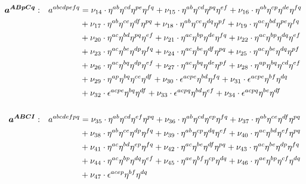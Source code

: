\documentclass[a4paper,12pt, DIV=14, BCOR=5mm, twoside, headsepline]{scrbook}
\begin{document}
\begin{align}
\begin{alignedat}{2}
\boldsymbol{a^{ABpCq}}&: \ \ \ & a^{abcdpefq}  &= \nu_{14}\cdot\eta^{ab}\eta^{cd}\eta^{pe}\eta^{fq}+\nu_{15}\cdot\eta^{ab}\eta^{cd}\eta^{pq}\eta^{ef}
+\nu_{16}\cdot\eta^{ab}\eta^{cp}\eta^{de}\eta^{fq}\\ &  &\hphantom{=} &
+\nu_{17}\cdot\eta^{ab}\eta^{ce}\eta^{df}\eta^{pq}+ 
\nu_{18}\cdot\eta^{ab}\eta^{ce}\eta^{dq}\eta^{pf}+\nu_{19}\cdot\eta^{ac}\eta^{bd}\eta^{pe}\eta^{fq} \\ &  &\hphantom{=} &
+\nu_{20}\cdot\eta^{ac}\eta^{bd}\eta^{pq}\eta^{ef}+\nu_{21}\cdot\eta^{ac}\eta^{bp}\eta^{de}\eta^{fq}+ 
\nu_{22}\cdot\eta^{ac}\eta^{bp}\eta^{dq}\eta^{ef} \\ &  &\hphantom{=} &
+\nu_{23}\cdot\eta^{ac}\eta^{be}\eta^{dp}\eta^{fq}+
\nu_{24}\cdot\eta^{ac}\eta^{be}\eta^{df}\eta^{pq}+\nu_{25}\cdot\eta^{ac}\eta^{be}\eta^{dq}\eta^{pf} \\ &  &\hphantom{=} &
+\nu_{26}\cdot\eta^{ac}\eta^{bq}\eta^{dp}\eta^{ef}+\nu_{27}\cdot\eta^{ac}\eta^{bq}\eta^{de}\eta^{pf}+ 
\nu_{28}\cdot\eta^{ap}\eta^{bq}\eta^{cd}\eta^{ef} \\ &  &\hphantom{=} &
+\nu_{29}\cdot\eta^{ap}\eta^{bq}\eta^{ce}\eta^{df} + \nu_{30}\cdot\epsilon^{acpe}\eta^{bd}\eta^{fq}+\nu_{31}\cdot\epsilon^{acpe}\eta^{bf}\eta^{dq} \\ &  &\hphantom{=} &
+\nu_{32}\cdot\epsilon^{acpe}\eta^{bq}\eta^{df}+\nu_{33}\cdot\epsilon^{acpq}\eta^{bd}\eta^{ef} 
+\nu_{34}\cdot\epsilon^{acpq}\eta^{be}\eta^{df} \\
\\
\boldsymbol{a^{ABCI}}&: \ \ \ & a^{abcdefpq}  &= \nu_{35}\cdot\eta^{ab}\eta^{cd}\eta^{ef}\eta^{pq}+\nu_{36}\cdot\eta^{ab}\eta^{cd}\eta^{ep}\eta^{fq}+\nu_{37}\cdot\eta^{ab}\eta^{ce}\eta^{df}\eta^{pq} \\ &  &\hphantom{=} &
+\nu_{38}\cdot\eta^{ab}\eta^{ce}\eta^{dp}\eta^{fq}+\nu_{39}\cdot\eta^{ab}\eta^{cp}\eta^{dq}\eta^{ef}+\nu_{40}\cdot\eta^{ac}\eta^{bd}\eta^{ef}\eta^{pq}
\\ &  &\hphantom{=} &
+\nu_{41}\cdot\eta^{ac}\eta^{bd}\eta^{ep}\eta^{fq}+\nu_{42}\cdot\eta^{ac}\eta^{be}\eta^{df}\eta^{pq}+\nu_{43}\cdot\eta^{ac}\eta^{be}\eta^{dp}\eta^{fq}
\\ &  &\hphantom{=} &
+\nu_{44}\cdot\eta^{ac}\eta^{bp}\eta^{dq}\eta^{ef}+\nu_{45}\cdot\eta^{ae}\eta^{bf}\eta^{cp}\eta^{dq}+\nu_{46}\cdot\eta^{ae}\eta^{bp}\eta^{cf}\eta^{dq} \\ &  &\hphantom{=} & 
+\nu_{47}\cdot\epsilon^{acep}\eta^{bf}\eta^{dq}
\end{alignedat}
\end{align}
\end{document}
